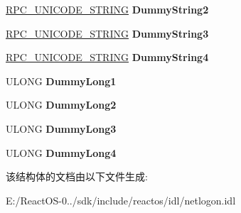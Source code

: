 \begin{DoxyCompactItemize}
\item 
\mbox{\label{struct___n_e_t_l_o_g_o_n___d_e_l_t_a___a_l_i_a_s_abb77880f47fb1be225e81cded56f1589}} 
\hyperlink{struct___r_p_c___u_n_i_c_o_d_e___s_t_r_i_n_g}{R\+P\+C\+\_\+\+U\+N\+I\+C\+O\+D\+E\+\_\+\+S\+T\+R\+I\+NG} {\bfseries Dummy\+String2}
\item 
\mbox{\label{struct___n_e_t_l_o_g_o_n___d_e_l_t_a___a_l_i_a_s_a59b3e03ba35da37978f4a541793f1942}} 
\hyperlink{struct___r_p_c___u_n_i_c_o_d_e___s_t_r_i_n_g}{R\+P\+C\+\_\+\+U\+N\+I\+C\+O\+D\+E\+\_\+\+S\+T\+R\+I\+NG} {\bfseries Dummy\+String3}
\item 
\mbox{\label{struct___n_e_t_l_o_g_o_n___d_e_l_t_a___a_l_i_a_s_a8bf2eb231216fdd828737869e3c29440}} 
\hyperlink{struct___r_p_c___u_n_i_c_o_d_e___s_t_r_i_n_g}{R\+P\+C\+\_\+\+U\+N\+I\+C\+O\+D\+E\+\_\+\+S\+T\+R\+I\+NG} {\bfseries Dummy\+String4}
\item 
\mbox{\label{struct___n_e_t_l_o_g_o_n___d_e_l_t_a___a_l_i_a_s_a48d49a3a46cd99c6800de3dd413050b4}} 
U\+L\+O\+NG {\bfseries Dummy\+Long1}
\item 
\mbox{\label{struct___n_e_t_l_o_g_o_n___d_e_l_t_a___a_l_i_a_s_afa65a00e817ad72825bba3dbbd86f367}} 
U\+L\+O\+NG {\bfseries Dummy\+Long2}
\item 
\mbox{\label{struct___n_e_t_l_o_g_o_n___d_e_l_t_a___a_l_i_a_s_aaa7cc495213f1d33ac90981fe46c4907}} 
U\+L\+O\+NG {\bfseries Dummy\+Long3}
\item 
\mbox{\label{struct___n_e_t_l_o_g_o_n___d_e_l_t_a___a_l_i_a_s_a06cab639fbc913da454a1f9bbe841610}} 
U\+L\+O\+NG {\bfseries Dummy\+Long4}
\end{DoxyCompactItemize}


该结构体的文档由以下文件生成\+:\begin{DoxyCompactItemize}
\item 
E\+:/\+React\+O\+S-\/0../sdk/include/reactos/idl/netlogon.\+idl\end{DoxyCompactItemize}

